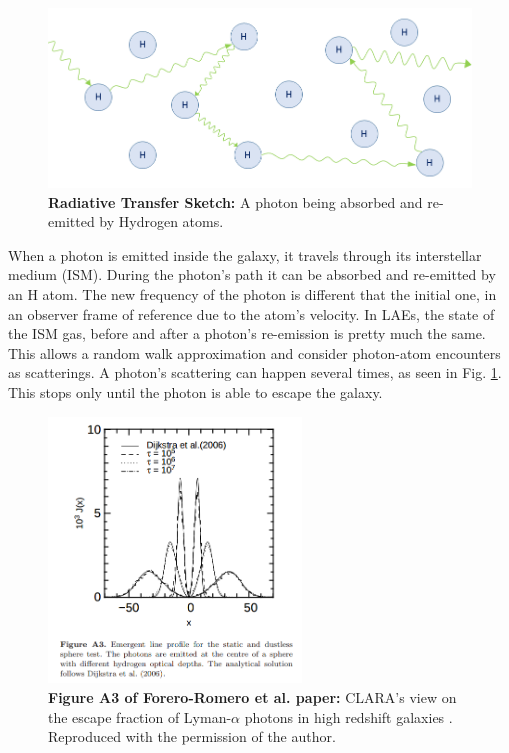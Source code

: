 \begin{figure}[h!]
	\begin{center}
		\includegraphics[width=1\textwidth]{./figures/chapter1/radiative_transfer}
	\end{center}
	\caption{\textbf{Radiative Transfer Sketch:} A \lya photon being absorbed and re-emitted by Hydrogen atoms. 
		\label{fig:radiative_transfer}}
\end{figure}

When a \lya photon is emitted inside the galaxy, it travels through its interstellar medium (ISM). During the photon's path it can be absorbed and re-emitted by an H atom. The new frequency of the photon is different that the initial one, in an observer frame of reference due to the atom's velocity. In LAEs, the state of the ISM gas, before and after a photon's re-emission is pretty much the same. This allows a random walk approximation and consider photon-atom encounters as scatterings. A photon's scattering can happen several times, as seen in Fig. \ref{fig:radiative_transfer}. This stops only until the photon is able to escape the galaxy. \\

\begin{figure}[h!]
	\begin{center}
		\includegraphics[width=0.6\textwidth]{./figures/chapter1/static}
	\end{center}
	\caption{\textbf{Figure A3 of Forero-Romero et al. paper:} CLARA's view on the escape fraction of Lyman-$\alpha$ photons in high redshift galaxies \cite{CLARA}. Reproduced with the permission of the author.
		\label{fig:static}}
\end{figure}

